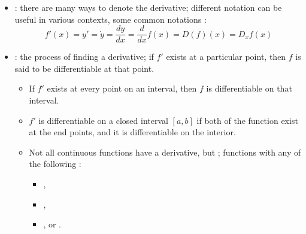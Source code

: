 \begin{itemize}
\begin{itemize}
    \item {}: there are many ways to denote the derivative;
      different notation can be useful in various contexts, some common
      notations :
      \[
        f'(x) = y' = \dot{y} = \frac{dy}{dx} = \frac{d}{dx} f(x) = D(f)(x) =
        D_x f(x)
      \]
    \item {}: the process of finding a derivative; if \( f'
      \) exists at a particular point, then \( f \) is said to be
      differentiable at that point.
      \begin{itemize}
        \item If \( f' \) exists at every point on an interval, then \( f \) is
          differentiable on that interval.
        \item \( f' \) is differentiable on a closed interval \( \left[ a,b
          \right] \) if both  of
          the function  exist at the end points, and it is differentiable on the
          interior.
        \item Not all continuous functions have a derivative, but ; functions with any of the
          following :
          \begin{itemize}
            \item {} ,
            \item {} ,
            \item {}, or .
          \end{itemize}
      \end{itemize}
  \end{itemize}
\end{itemize}

